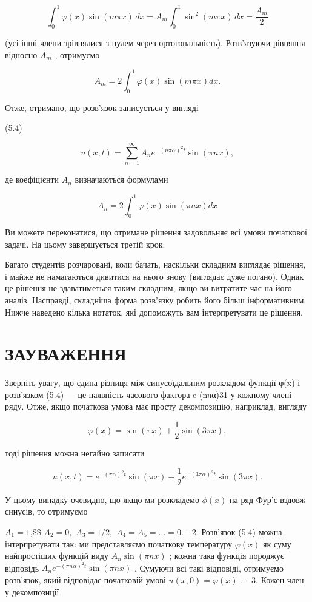 \documentclass[
  ukrainian,
]{article}
\begin{document}
\[
\int_{0}^{1} \varphi(x) \sin(m\pi x) \, dx = A_{m} \int_{0}^{1} \sin^{2}(m\pi x) \, dx = \frac{A_{m}}{2}
\]

(усі інші члени зрівнялися з нулем через ортогональність). Розв'язуючи
рівняння відносно \(A_m\) , отримуємо

\[
A_m = 2 \int_0^1 \varphi(x) \sin(m\pi x) dx.
\]

Отже, отримано, що розв'язок записується у вигляді

(5.4)

\[
u(x, t) = \sum_{n=1}^{\infty} A_n e^{-(n\pi\alpha)^2 t} \sin(\pi n x),
\]

де коефіцієнти \(A_n\) визначаються формулами

\[
A_n = 2\int_0^1 \varphi(x) \sin(\pi nx) dx
\]

Ви можете переконатися, що отримане рішення задовольняє всі умови
початкової задачі. На цьому завершується третій крок.

Багато студентів розчаровані, коли бачать, наскільки складним виглядає
рішення, і майже не намагаються дивитися на нього знову (виглядає дуже
погано). Однак це рішення не здаватиметься таким складним, якщо ви
витратите час на його аналіз. Насправді, складніша форма розв'язку
робить його більш інформативним. Нижче наведено кілька нотаток, які
допоможуть вам інтерпретувати це рішення.

\section{ЗАУВАЖЕННЯ}\label{ux437ux430ux443ux432ux430ux436ux435ux43dux43dux44f-4}

Зверніть увагу, що єдина різниця між синусоїдальним розкладом функції
φ(x) і розв'язком (5.4) --- це наявність часового фактора e-(nπα)31 у
кожному члені ряду. Отже, якщо початкова умова має просту декомпозицію,
наприклад, вигляду

\[
\varphi(x) = \sin(\pi x) + \frac{1}{2}\sin(3\pi x),
\]

тоді рішення можна негайно записати

\[
u(x, t) = e^{-(\pi\alpha)^2 t} \sin(\pi x) + \frac{1}{2} e^{-(3\pi\alpha)^2 t} \sin(3\pi x).
\]

У цьому випадку очевидно, що якщо ми розкладемо \(\phi(x)\) на ряд Фур'є
вздовж синусів, то отримуємо

\(A_1 = 1\),\$\$ \(A_2 = 0,\) \(A_3 = 1/2,\) \(A_4 = A_5 = \dots = 0.\)
- 2. Розв'язок (5.4) можна інтерпретувати так: ми представляємо
початкову температуру \(\varphi(x)\) як суму найпростіших функцій виду
\(A_n \sin(\pi nx)\) ; кожна така функція породжує відповідь
\(A_n e^{-(\pi n\alpha)^2 t} \sin(\pi nx)\) . Сумуючи всі такі
відповіді, отримуємо розв'язок, який відповідає початковій умові
\(u(x, 0) = \varphi(x)\) . - 3. Кожен член у декомпозиції
\end{document}
